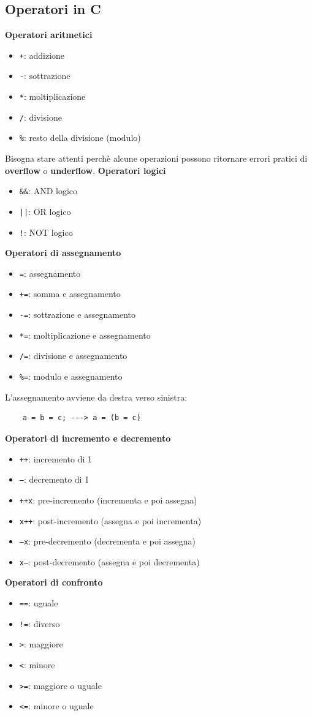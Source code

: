 \documentclass[12pt,a4paper]{article}
\begin{document}
\subsection{Operatori in C}
\textbf{Operatori aritmetici}
\begin{itemize}
    \item \texttt{+}: addizione
    \item \texttt{-}: sottrazione
    \item \texttt{*}: moltiplicazione
    \item \texttt{/}: divisione
    \item \texttt{\%}: resto della divisione (modulo)
\end{itemize}
Bisogna stare attenti perchè alcune operazioni possono ritornare errori pratici di \textbf{overflow} o \textbf{underflow}.
\textbf{Operatori logici}
\begin{itemize}
    \item \texttt{\&\&}: AND logico
    \item \texttt{||}: OR logico
    \item \texttt{!}: NOT logico
\end{itemize}
\textbf{Operatori di assegnamento}
\begin{itemize}
    \item \texttt{=}: assegnamento
    \item \texttt{+=}: somma e assegnamento
    \item \texttt{-=}: sottrazione e assegnamento
    \item \texttt{*=}: moltiplicazione e assegnamento
    \item \texttt{/=}: divisione e assegnamento
    \item \texttt{\%=}: modulo e assegnamento
\end{itemize}
L'assegnamento avviene da destra verso sinistra:
\begin{lstlisting}
    a = b = c; ---> a = (b = c)
\end{lstlisting}
\textbf{Operatori di incremento e decremento}
\begin{itemize}
    \item \texttt{++}: incremento di 1
    \item \texttt{--}: decremento di 1
    \item \texttt{++x}: pre-incremento (incrementa e poi assegna)
    \item \texttt{x++}: post-incremento (assegna e poi incrementa)
    \item \texttt{--x}: pre-decremento (decrementa e poi assegna)
    \item \texttt{x--}: post-decremento (assegna e poi decrementa)
\end{itemize}
\textbf{Operatori di confronto}
\begin{itemize}
    \item \texttt{==}: uguale
    \item \texttt{!=}: diverso
    \item \texttt{>}: maggiore
    \item \texttt{<}: minore
    \item \texttt{>=}: maggiore o uguale
    \item \texttt{<=}: minore o uguale
\end{itemize}
\end{document}
